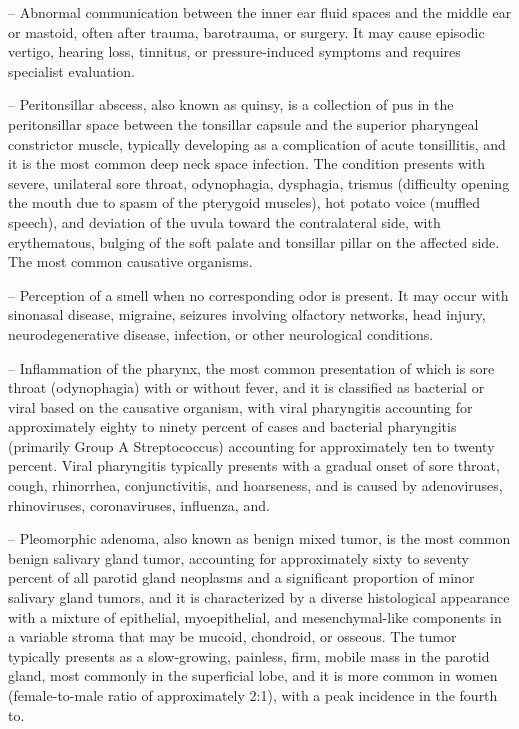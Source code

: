 -- Abnormal communication between the inner ear fluid spaces and the middle ear or mastoid, often after trauma, barotrauma, or surgery. It may cause episodic vertigo, hearing loss, tinnitus, or pressure-induced symptoms and requires specialist evaluation.

-- Peritonsillar abscess, also known as quinsy, is a collection of pus in the peritonsillar space between the tonsillar capsule and the superior pharyngeal constrictor muscle, typically developing as a complication of acute tonsillitis, and it is the most common deep neck space infection. The condition presents with severe, unilateral sore throat, odynophagia, dysphagia, trismus (difficulty opening the mouth due to spasm of the pterygoid muscles), hot potato voice (muffled speech), and deviation of the uvula toward the contralateral side, with erythematous, bulging of the soft palate and tonsillar pillar on the affected side. The most common causative organisms.

-- Perception of a smell when no corresponding odor is present. It may occur with sinonasal disease, migraine, seizures involving olfactory networks, head injury, neurodegenerative disease, infection, or other neurological conditions.

-- Inflammation of the pharynx, the most common presentation of which is sore throat (odynophagia) with or without fever, and it is classified as bacterial or viral based on the causative organism, with viral pharyngitis accounting for approximately eighty to ninety percent of cases and bacterial pharyngitis (primarily Group A Streptococcus) accounting for approximately ten to twenty percent. Viral pharyngitis typically presents with a gradual onset of sore throat, cough, rhinorrhea, conjunctivitis, and hoarseness, and is caused by adenoviruses, rhinoviruses, coronaviruses, influenza, and.

-- Pleomorphic adenoma, also known as benign mixed tumor, is the most common benign salivary gland tumor, accounting for approximately sixty to seventy percent of all parotid gland neoplasms and a significant proportion of minor salivary gland tumors, and it is characterized by a diverse histological appearance with a mixture of epithelial, myoepithelial, and mesenchymal-like components in a variable stroma that may be mucoid, chondroid, or osseous. The tumor typically presents as a slow-growing, painless, firm, mobile mass in the parotid gland, most commonly in the superficial lobe, and it is more common in women (female-to-male ratio of approximately 2:1), with a peak incidence in the fourth to.

